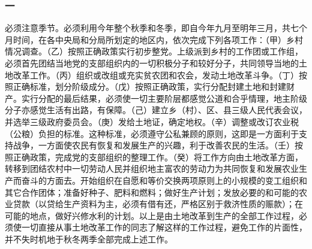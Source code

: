 \documentclass[cn,11pt,chinese]{elegantbook}
\def\myformat#1{\hfil\hfil #1}
\begin{document}
\subsubsection*{\myformat{一}}
必须注意季节。必须利用今年整个秋季和冬季，即自今年九月至明年三月，共七个月时间，在各中央局和分局所划定的地区内，依次完成下列各项工作：（甲）乡村情况调查。（乙）按照正确政策实行初步整党。上级派到乡村的工作团或工作组，必须首先团结当地党的支部组织内的一切积极分子和较好分子，共同领导当地的土地改革工作。（丙）组织或改组或充实贫农团和农会，发动土地改革斗争。（丁）按照正确标准，划分阶级成分。（戊）按照正确政策，实行分配封建土地和封建财产。实行分配的最后结果，必须使一切主要阶层都感觉公道和合乎情理，地主阶级分子亦感觉生活有出路，有保障。（己）建立乡（村）、区、县三级人民代表会议，并选举三级政府委员会。（庚）发给土地证，确定地权。（辛）调整或改订农业税（公粮）负担的标准。这种标准，必须遵守公私兼顾的原则，这即是一方面利于支持战争，一方面使农民有恢复和发展生产的兴趣，利于改善农民的生活。（壬）按照正确政策，完成党的支部组织的整理工作。（癸）将工作方向由土地改革方面，转移到团结农村中一切劳动人民并组织地主富农的劳动力为共同恢复和发展农业生产而奋斗的方面去。开始组织在自愿和等价交换两项原则上的小规模的变工组织和其它合作团体；准备好种子、肥料和燃料；做好生产计划；发放必要的和可能的农业贷款（以贷给生产资料为主，必须有借有还，严格区别于救济性质的赈款）；在可能的地点，做好兴修水利的计划。以上是由土地改革到生产的全部工作过程，必须使一切直接从事土地改革工作的同志了解这样的工作过程，避免工作的片面性，并不失时机地于秋冬两季全部完成上述工作。\\
\end{document}

